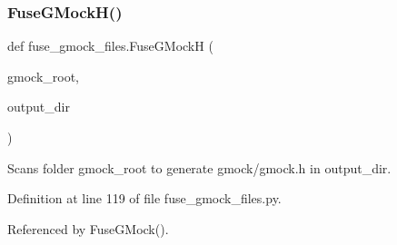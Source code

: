 \subsubsection{\texorpdfstring{Fuse\+G\+Mock\+H()}{FuseGMockH()}}
{\footnotesize\ttfamily def fuse\+\_\+gmock\+\_\+files.\+Fuse\+G\+MockH (\begin{DoxyParamCaption}\item[{}]{gmock\+\_\+root,  }\item[{}]{output\+\_\+dir }\end{DoxyParamCaption})}

\begin{DoxyVerb}Scans folder gmock_root to generate gmock/gmock.h in output_dir.\end{DoxyVerb}
 

Definition at line 119 of file fuse\+\_\+gmock\+\_\+files.\+py.



Referenced by Fuse\+G\+Mock().


